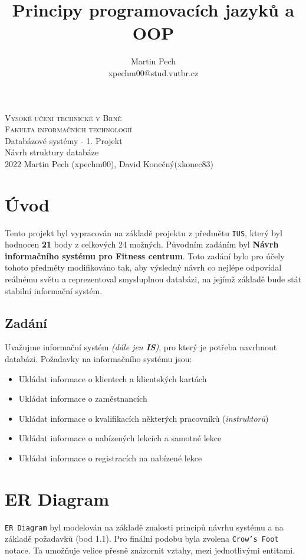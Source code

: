 \documentclass[10pt,a4paper]{article}
\title{Principy programovacích jazyků a OOP}
\author{Martin Pech\\xpechm00@stud.vutbr.cz}
\begin{document}
	\begin{titlepage}
		\begin{center}
			\Huge
			\textsc{Vysoké učení technické v Brně\\ Fakulta informačních technologií} \\[70mm]
			\LARGE
			Databázové systémy - 1. Projekt\\
			Návrh struktury databáze
			\\[135mm]
			{\Large 2022 \hspace{50mm}Martin Pech (xpechm00), David Konečný(xkonec83)}
		\end{center}
	\end{titlepage}

\section{Úvod}
Tento projekt byl vypracován na základě projektu z předmětu \texttt{IUS}, který byl hodnocen \textbf{21} body z celkových 24 možných. Původním zadáním byl \textbf{Návrh informačního systému pro Fitness centrum}. Toto zadání bylo pro účely tohoto předměty modifikováno tak, aby výsledný návrh co nejlépe odpovídal reálnému světu a reprezentoval smysluplnou databázi, na jejímž základě bude stát stabilní informační systém.
\subsection{Zadání}
Uvažujme informační systém \textit{(dále jen \textbf{IS})}, pro který je potřeba navrhnout databázi. Požadavky na informačního systému jsou:
\begin{itemize}
	\item Ukládat informace o klientech a klientských kartách
	\item Ukládat informace o zaměstnancích
	\item Ukládat informace o kvalifikacích některých pracovníků (\textit{instruktorů})
	\item Ukládat informace o nabízených lekcích a samotné lekce
	\item Ukládat informace o registracích na nabízené lekce
\end{itemize}

\section{ER Diagram}
\texttt{ER Diagram} byl modelován na základě znalosti principů návrhu systému a na základě požadavků (bod 1.1). Pro finální podobu byla zvolena \texttt{Crow's Foot} notace. Ta umožňuje velice přesně znázornit vztahy, mezi jednotlivými entitami.
\end{document}
